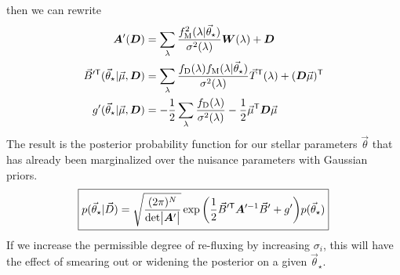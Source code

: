 \documentclass[preprint]{aastex} %
\newcommand{\vt}{\vec{\theta}}
\newcommand{\vstar}{\vt_{\star}}
\newcommand{\fM}{f_{\rm M}}
\newcommand{\fD}{f_{\rm D}}
\newcommand{\vD}{\vec{D}}
\newcommand{\trans}{\mathsf{T}}
\begin{document}
then we can rewrite
\begin{align}
  {\bm A}^\prime({\bm D}) &= \sum_\lambda \frac{\fM^2(\lambda|\vstar)}{\sigma^2(\lambda)} {\bm W}(\lambda) + {\bm D}\\
  \vec{B}^{\prime\trans}(\vstar | \vec{\mu}, {\bm D}) &= \sum_\lambda \frac{\fD(\lambda)\fM(\lambda | \vstar)}{\sigma^2(\lambda)} \vec{T}^\trans(\lambda) + ({\bm D} \vec{\mu})^\trans \\
  g^\prime(\vstar | \vec{\mu}, {\bm D}) &= -\frac{1}{2} \sum_\lambda \frac{\fD(\lambda)}{\sigma^2(\lambda)}- \frac{1}{2} \vec{\mu}^\trans {\bm D} \vec{\mu}\\
\end{align}
The result is the posterior probability function for our stellar parameters $\vt$ that has already been marginalized over the nuisance parameters with Gaussian priors.
\begin{equation}
  \boxed{
  p(\vstar | \vD) = \sqrt{\frac{(2 \pi )^N}{ {\rm det} \bigl |{\bm A}^\prime \bigr |}} \exp{ \left ( \frac{1}{2} \vec{B}^{\prime\trans} {\bm A}^{\prime -1} \vec{B}^\prime + g^\prime \right )} p(\vstar)
}
\end{equation}
If we increase the permissible degree of re-fluxing by increasing $\sigma_i$, this will have the effect of smearing out or widening the posterior on a given $\vstar$.
\end{document}
